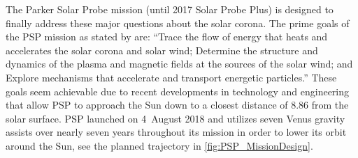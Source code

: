 The Parker Solar Probe mission (until 2017 Solar Probe Plus) is designed to finally address these major questions about the solar corona. The prime goals of the PSP mission as stated by \citet{Fox2015} are: ``Trace the flow of energy that heats and accelerates the solar corona and solar wind; Determine the structure and dynamics of the plasma and magnetic fields at the sources of the solar wind; and Explore mechanisms that accelerate and transport energetic particles.''
These goals seem achievable due to recent developments in technology and engineering that allow PSP to approach the Sun down to a closest distance of \SI{8.86}{\Rs} from the solar surface. PSP launched on 4~August 2018 and utilizes seven Venus gravity assists over nearly seven years throughout its mission in order to lower its orbit around the Sun, see the planned trajectory in \autoref{fig:PSP_MissionDesign}.
\begin{figure}
\end{figure}

